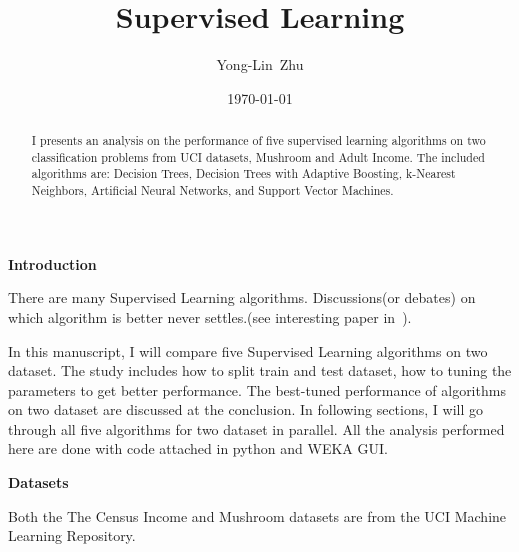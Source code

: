 \documentclass[         %
aps,                    %
prl,                    %
showpacs,               %
superscriptaddress,    %
nofootinbib,            %
twocolumn,             %
showkeys,               %
preprintnumbers,        %
floatfix               %
]{revtex4-1}               %
\begin{document}
\title{Supervised Learning}
\author{Yong-Lin~Zhu}
\affiliation{}


\date{\today}
\begin{abstract}
I presents an analysis on the performance of five supervised learning algorithms on two classification problems from UCI datasets,  Mushroom and Adult Income. 
The included algorithms are: Decision Trees, Decision Trees with Adaptive Boosting, k-Nearest Neighbors, Artificial Neural Networks, and Support Vector Machines.
\end{abstract}

\maketitle

\vskip 1.3cm
{\bf Introduction}\label{intro}

There are many Supervised Learning algorithms. Discussions(or debates) on which algorithm is better never settles.(see interesting paper in~\cite{fernandez2014we}).

In this manuscript, I will compare five Supervised Learning algorithms on two dataset. The study includes how to split train and test dataset, how to tuning the parameters to get better performance. The best-tuned performance of algorithms on two dataset are discussed at the conclusion. In following sections, I will go through all five algorithms for two dataset in parallel. All the analysis performed here are done with code attached in python and WEKA GUI.



{\bf Datasets}\label{datapre}

Both the The Census Income and Mushroom datasets are from the UCI Machine Learning Repository. 
\end{document}
